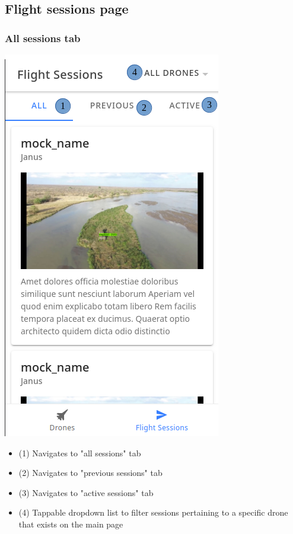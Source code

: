 \newpage
\subsection{Flight sessions page}
\subsubsection{All sessions tab}
\begin{minipage}[c]{0.5\linewidth}
	\centering
	\includegraphics[scale=0.4]{./assets/images/all-sessions.png}
	\label{fig: sessionsPageAll}
\end{minipage}
\begin{minipage}[c]{0.5\linewidth}
	\begin{itemize}
		\item (1) Navigates to "all sessions" tab
		\item (2) Navigates to "previous sessions" tab
		\item (3) Navigates to "active sessions" tab
		\item (4) Tappable dropdown list to filter sessions pertaining to a specific drone that exists on the main page 
	\end{itemize}
\end{minipage}


